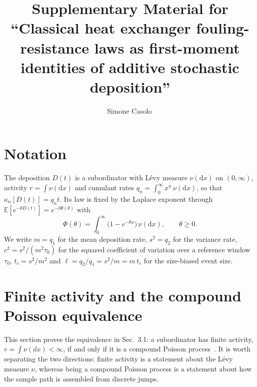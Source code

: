 \documentclass[preprint,12pt]{elsarticle}
\newcommand{\dd}{\mathrm{d}}
\begin{document}
\begin{frontmatter}

\title{Supplementary Material for\\ ``Classical heat exchanger fouling-resistance laws as first-moment identities of additive stochastic deposition''}

\author[cog]{Simone Casolo\,}

\end{frontmatter}

\section{Notation}
\label{app:notation}

The deposition $D(t)$ is a subordinator with L\'evy measure $\nu(\dd x)$ on
$(0,\infty)$, activity $r=\int\nu(\dd x)$ and cumulant rates
$q_n=\int_0^\infty x^n\,\nu(\dd x)$, so that $\kappa_n[D(t)]=q_nt$. Its law is
fixed by the Laplace exponent through
$\mathbb E[e^{-\theta D(t)}]=e^{-t\Phi(\theta)}$ with
\begin{equation}
  \Phi(\theta)=\int_0^\infty\bigl(1-e^{-\theta x}\bigr)\,\nu(\dd x),
  \qquad\theta\ge0 .
  \label{eq:S_lk}
\end{equation}
We write $m=q_1$ for the mean deposition rate, $s^2=q_2$ for the variance
rate, $c^2=s^2/(m^2\tau_0)$ for the squared coefficient of variation over a
reference window $\tau_0$, $t_c=s^2/m^2$ and $\ell=q_2/q_1=s^2/m=m\,t_c$ for
the size-biased event size. 

\section{Finite activity and the compound Poisson equivalence}
\label{app:cpp_equivalence}

This section proves the equivalence in Sec.~3.1: a
subordinator has finite activity, $r=\int\nu(dx)<\infty$, if and only if it
is a compound Poisson process~\cite{Sato1999,Applebaum2009}. 
It is worth separating the two directions:
finite activity is a statement about the L\'evy measure $\nu$, whereas
being a compound Poisson process is a statement about how the sample path
is assembled from discrete jumps. 
\end{document}
